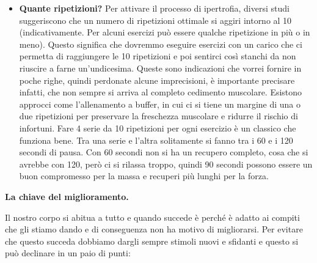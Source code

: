 \documentclass[12pt]{book} %
\begin{document}
\begin{itemize}
\item \textbf{Quante ripetizioni?}
Per attivare il processo di ipertrofia, diversi studi suggeriscono che un numero di ripetizioni ottimale si aggiri intorno al 10 (indicativamente. Per alcuni esercizi può essere qualche ripetizione in più o in meno). Questo significa che dovremmo eseguire esercizi con un carico che ci permetta di raggiungere le 10 ripetizioni e poi sentirci così stanchi da non riuscire a farne un'undicesima.
Queste sono indicazioni che vorrei fornire in poche righe, quindi perdonate alcune imprecisioni, è importante precisare infatti, che non sempre si arriva al completo cedimento muscolare. Esistono approcci come l'allenamento a buffer, in cui ci si tiene un margine di una o due ripetizioni per preservare la freschezza muscolare e ridurre il rischio di infortuni.
Fare 4 serie da 10 ripetizioni per ogni esercizio è un classico che funziona bene. Tra una serie e l'altra solitamente si fanno tra i 60 e i 120 secondi di pausa. Con 60 secondi non si ha un recupero completo, cosa che si avrebbe con 120, però ci si rilassa troppo, quindi 90 secondi possono essere un buon compromesso per la massa e recuperi più lunghi per la forza.
\end{itemize}

\textbf{La chiave del miglioramento.}

Il nostro corpo si abitua a tutto e quando succede è perché è adatto ai compiti che gli stiamo dando e di conseguenza non ha motivo di migliorarsi.
Per evitare che questo succeda dobbiamo dargli sempre stimoli nuovi e sfidanti e questo si può declinare in un paio di punti:
\end{document}
